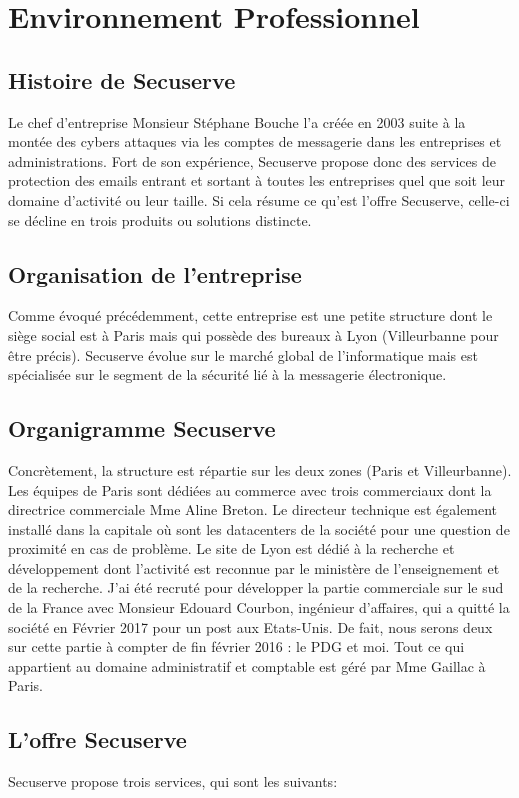 \section{Environnement Professionnel }
\subsection{Histoire de Secuserve}
Le chef d’entreprise Monsieur Stéphane Bouche l’a créée en 2003 suite à la montée des cybers attaques via les comptes de messagerie dans les entreprises et administrations. Fort de son expérience, Secuserve propose donc des services de protection des emails entrant et sortant à toutes les entreprises quel que soit leur domaine d’activité ou leur taille. Si cela résume ce qu’est l’offre Secuserve, celle-ci se décline en trois produits ou solutions distincte.

\subsection{Organisation de l'entreprise}
Comme évoqué précédemment, cette entreprise est une petite structure dont le siège social est à Paris mais qui possède des bureaux à Lyon (Villeurbanne pour être précis). 
Secuserve évolue sur le marché global de l’informatique mais est spécialisée sur le segment de la sécurité lié à la messagerie électronique.
\subsection{Organigramme Secuserve}
Concrètement, la structure est répartie sur les deux zones (Paris et Villeurbanne).
Les équipes de Paris sont dédiées au commerce avec trois commerciaux dont la directrice commerciale Mme Aline Breton. Le directeur technique est également installé dans la capitale où sont les datacenters de la société pour une question de proximité en cas de problème. Le site de Lyon est dédié à la recherche et développement dont l’activité est reconnue par le ministère de l’enseignement et de la recherche. J’ai été recruté pour développer la partie commerciale sur le sud de la France avec Monsieur Edouard Courbon, ingénieur d’affaires,  qui a quitté la société en Février 2017 pour un post aux Etats-Unis. De fait, nous serons deux sur cette partie à compter de fin février 2016 : le PDG et moi.
Tout ce qui appartient au domaine administratif et comptable est géré par Mme Gaillac à Paris.

\subsection{L’offre Secuserve}
Secuserve propose trois services, qui sont les suivants:
